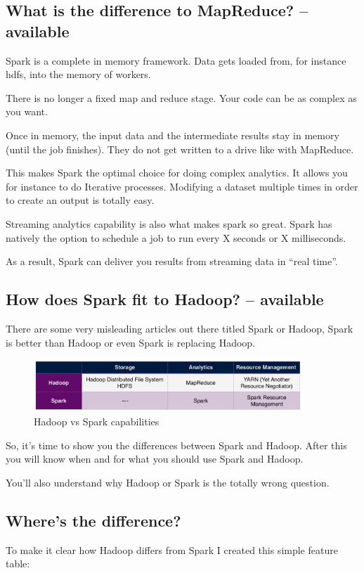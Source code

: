 \documentclass[12pt, numbers=noenddot]{scrreprt} %
\begin{document}
\subsection{What is the difference to MapReduce? -- available}
Spark is a complete in memory framework. Data gets loaded from, for instance hdfs, into the memory of workers.

There is no longer a fixed map and reduce stage. Your code can be as complex as you want.

Once in memory, the input data and the intermediate results stay in memory (until the job finishes). They do not get written to a drive like with MapReduce.

This makes Spark the optimal choice for doing complex analytics. It allows you for instance to do Iterative processes. Modifying a dataset multiple times in order to create an output is totally easy.

Streaming analytics capability is also what makes spark so great. Spark has natively the option to schedule a job to run every X seconds or X milliseconds.

As a result, Spark can deliver you results from streaming data in “real time”.


\subsection{How does Spark fit to Hadoop? -- available}
There are some very misleading articles out there titled Spark or Hadoop, Spark is better than Hadoop or even Spark is replacing Hadoop.

\begin{figure}[htbp]
  \centering
     \includegraphics[width=0.9\textwidth]{images/Table-Hadoop-and-Spark}
  \caption{Hadoop vs Spark capabilities}
  \label{fig:Bild1}
\end{figure}



So, it's time to show you the differences between Spark and Hadoop. After this you will know when and for what you should use Spark and Hadoop.

You’ll also understand why Hadoop or Spark is the totally wrong question.

\subsection{Where's the difference?}
To make it clear how Hadoop differs from Spark I created this simple feature table:
\end{document}
